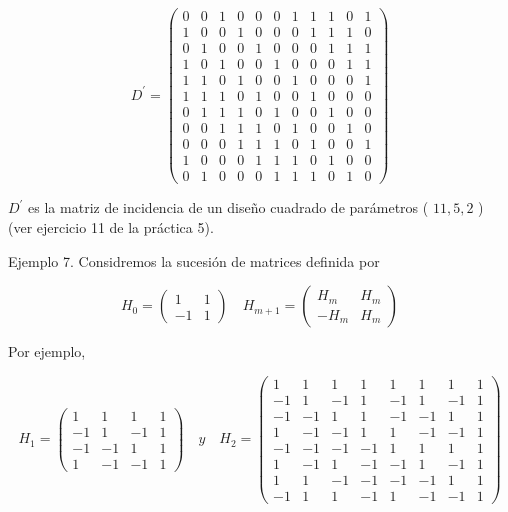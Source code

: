 \documentclass[10pt]{article}
\begin{document}
$$
D^{\prime}=\left(\begin{array}{lllllllllll}
0 & 0 & 1 & 0 & 0 & 0 & 1 & 1 & 1 & 0 & 1 \\
1 & 0 & 0 & 1 & 0 & 0 & 0 & 1 & 1 & 1 & 0 \\
0 & 1 & 0 & 0 & 1 & 0 & 0 & 0 & 1 & 1 & 1 \\
1 & 0 & 1 & 0 & 0 & 1 & 0 & 0 & 0 & 1 & 1 \\
1 & 1 & 0 & 1 & 0 & 0 & 1 & 0 & 0 & 0 & 1 \\
1 & 1 & 1 & 0 & 1 & 0 & 0 & 1 & 0 & 0 & 0 \\
0 & 1 & 1 & 1 & 0 & 1 & 0 & 0 & 1 & 0 & 0 \\
0 & 0 & 1 & 1 & 1 & 0 & 1 & 0 & 0 & 1 & 0 \\
0 & 0 & 0 & 1 & 1 & 1 & 0 & 1 & 0 & 0 & 1 \\
1 & 0 & 0 & 0 & 1 & 1 & 1 & 0 & 1 & 0 & 0 \\
0 & 1 & 0 & 0 & 0 & 1 & 1 & 1 & 0 & 1 & 0
\end{array}\right)
$$

$D^{\prime}$ es la matriz de incidencia de un diseño cuadrado de parámetros ( $11,5,2$ ) (ver ejercicio 11 de la práctica 5).

Ejemplo 7. Considremos la sucesión de matrices definida por

$$
H_{0}=\left(\begin{array}{cc}
1 & 1 \\
-1 & 1
\end{array}\right) \quad H_{m+1}=\left(\begin{array}{cc}
H_{m} & H_{m} \\
-H_{m} & H_{m}
\end{array}\right)
$$

Por ejemplo,

$$
H_{1}=\left(\begin{array}{cccc}
1 & 1 & 1 & 1 \\
-1 & 1 & -1 & 1 \\
-1 & -1 & 1 & 1 \\
1 & -1 & -1 & 1
\end{array}\right) \quad y \quad H_{2}=\left(\begin{array}{cccccccc}
1 & 1 & 1 & 1 & 1 & 1 & 1 & 1 \\
-1 & 1 & -1 & 1 & -1 & 1 & -1 & 1 \\
-1 & -1 & 1 & 1 & -1 & -1 & 1 & 1 \\
1 & -1 & -1 & 1 & 1 & -1 & -1 & 1 \\
-1 & -1 & -1 & -1 & 1 & 1 & 1 & 1 \\
1 & -1 & 1 & -1 & -1 & 1 & -1 & 1 \\
1 & 1 & -1 & -1 & -1 & -1 & 1 & 1 \\
-1 & 1 & 1 & -1 & 1 & -1 & -1 & 1
\end{array}\right)
$$
\end{document}
